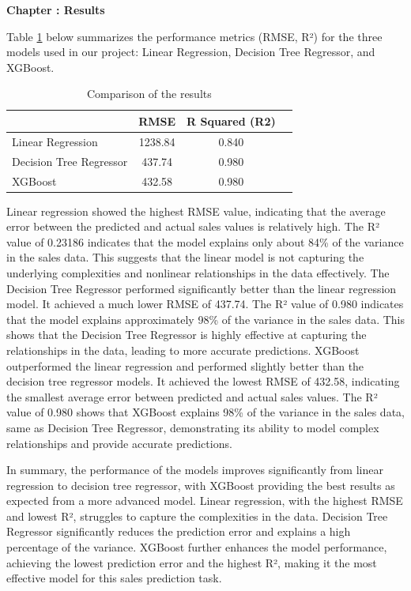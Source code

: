 \documentclass{article}
\newcounter{chapter}
\renewcommand{\thechapter}{\arabic{chapter}}
\newcommand{\mychapter}[1]{
    \stepcounter{chapter}
    \clearpage %
    \noindent
    \begin{center}
        \LARGE\bfseries Chapter \thechapter: #1
    \end{center}
    \vspace{0.25in} %
}
\begin{document}
\mychapter{Results}
Table \ref{tab:comparison} below summarizes the performance metrics (RMSE, R²) for the three models used in our project: Linear Regression, Decision Tree Regressor, and XGBoost.

\begin{table}[h]
    \centering
    \begin{tabular}{|l|c|c|p{5cm}|} 
        \hline
        \textbf{ } & \textbf{RMSE} & \textbf{R Squared (R2)}  \\
        \hline
        Linear Regression & 1238.84 & 0.840  \\
        \hline
        Decision Tree Regressor & 437.74 & 0.980 \\
        \hline
        XGBoost & 432.58 & 0.980 \\
        \hline
  
     \end{tabular}
    \caption{Comparison of the results}
    \label{tab:comparison} %
\end{table}

Linear regression showed the highest RMSE value, indicating that the average error between the predicted and actual sales values is relatively high. The R² value of 0.23186 indicates that the model explains only about 84\% of the variance in the sales data. This suggests that the linear model is not capturing the underlying complexities and nonlinear relationships in the data effectively. The Decision Tree Regressor performed significantly better than the linear regression model. It achieved a much lower RMSE of 437.74. The R² value of 0.980 indicates that the model explains approximately 98\% of the variance in the sales data. This shows that the Decision Tree Regressor is highly effective at capturing the relationships in the data, leading to more accurate predictions. XGBoost outperformed the linear regression and performed slightly better than the decision tree regressor models. It achieved the lowest RMSE of 432.58, indicating the smallest average error between predicted and actual sales values. The R² value of 0.980 shows that XGBoost explains 98\% of the variance in the sales data, same as Decision Tree Regressor, demonstrating its ability to model complex relationships and provide accurate predictions.

In summary, the performance of the models improves significantly from linear regression to decision tree regressor, with XGBoost providing the best results as expected from a more advanced model. Linear regression, with the highest RMSE and lowest R², struggles to capture the complexities in the data. Decision Tree Regressor significantly reduces the prediction error and explains a high percentage of the variance. XGBoost further enhances the model performance, achieving the lowest prediction error and the highest R², making it the most effective model for this sales prediction task.
\end{document}
